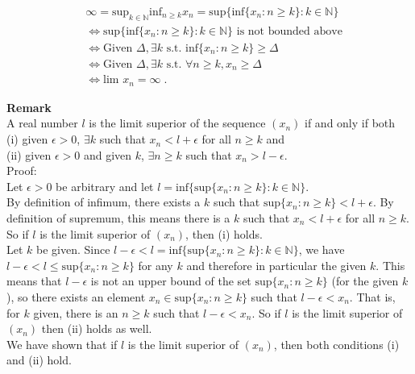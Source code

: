 \documentclass[a4paper]{article}
\begin{document}
\begin{align*}
&\infty = \text{sup}_{k\in \mathbb{N}}\text{inf}_{n\geq k} x_n = \text{sup}\{\text{inf} \{x_n : n \geq k\} : k \in \mathbb{N}\}\\
&\iff \text{sup}\{\text{inf} \{x_n : n \geq k\} : k \in \mathbb{N}\} \text{ is not bounded above}\\
&\iff \text{Given } \Delta, \exists k \text{ s.t. } \text{inf}\{x_n : n \geq k\} \geq \Delta\\
&\iff \text{Given } \Delta, \exists k \text{ s.t. } \forall n\geq k, x_n \geq \Delta \\
&\iff \text{lim } x_n = \infty\;.
\end{align*}

{\bf Remark}\\
A real number $l$ is the limit superior of the sequence $(x_n)$ if and only if both\\
(i) given $\epsilon >0$, $\exists k$ such that $x_n < l+\epsilon$ for all $n \geq k$ and \\
(ii) given $\epsilon >0$ and given $k$, $\exists n \geq k$ such that $x_n > l - \epsilon$.\\

Proof:\\

Let $\epsilon > 0$ be arbitrary and let $l = \text{inf}\{\text{sup} \{x_n : n \geq k\} : k \in \mathbb{N}\}$.\\

By definition of infimum, there exists a $k$ such that $\text{sup} \{x_n : n \geq k\} < l+\epsilon$. By definition of supremum, this means there is a $k$ such that $x_n < l + \epsilon$ for all $n \geq k$. So if $l$ is the limit superior of $(x_n)$, then (i) holds. \\

Let $k$ be given. Since $l-\epsilon < l = \text{inf}\{\text{sup} \{x_n : n \geq k\} : k \in \mathbb{N}\}$, we have $l-\epsilon<l\leq \text{sup} \{x_n : n \geq k\}$ for any $k$ and therefore in particular the given $k$. This means that $l-\epsilon$ is not an upper bound of the set $\text{sup} \{x_n : n \geq k\}$ (for the given $k$), so there exists an element $x_n \in \text{sup} \{x_n : n \geq k\}$ such that $l-\epsilon < x_n$. That is, for $k$ given, there is an $n\geq k$ such that $l-\epsilon < x_n$. So if $l$ is the limit superior of $(x_n)$ then (ii) holds as well.\\

We have shown that if $l$ is the limit superior of $(x_n)$, then both conditions (i) and (ii) hold.\\
\end{document}
